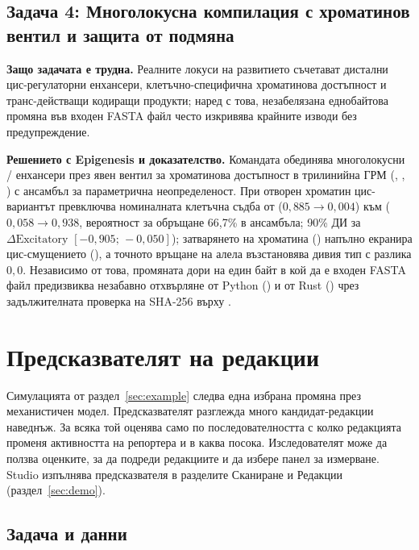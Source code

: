 \documentclass[10.5pt,a4paper]{article}
\begin{document}
\subsection{Задача 4: Многолокусна компилация с хроматинов вентил и защита от подмяна}

\textbf{Защо задачата е трудна.} Реалните локуси на развитието съчетават дистални цис-регулаторни енхансери, клетъчно-специфична хроматинова достъпност и транс-действащи кодиращи продукти; наред с това, незабелязана еднобайтова промяна във входен FASTA файл често изкривява крайните изводи без предупреждение.

\textbf{Решението с Epigenesis и доказателство.} Командата  обединява многолокусни / енхансери през явен вентил за хроматинова достъпност в трилинийна ГРМ (, , ) с ансамбъл за параметрична неопределеност. При отворен хроматин цис-вариантът превключва номиналната клетъчна съдба от  ($0{,}885\to 0{,}004$) към  ($0{,}058\to 0{,}938$, вероятност за обръщане 66,7\% в ансамбъла; 90\% ДИ за $\Delta\text{Excitatory}$ $[-0{,}905;\, -0{,}050]$); затварянето на хроматина () напълно екранира цис-смущението (), а точното връщане на алела възстановява дивия тип с разлика $0{,}0$. Независимо от това, промяната дори на един байт в кой да е входен FASTA файл предизвиква незабавно отхвърляне от Python () и от Rust () чрез задължителната проверка на SHA-256 върху .

\section{Предсказвателят на редакции}\label{sec:predictor}

Симулацията от раздел~\ref{sec:example} следва една избрана промяна през механистичен модел. Предсказвателят разглежда много кандидат-редакции наведнъж. За всяка той оценява само по последователността с колко редакцията променя активността на репортера и в каква посока. Изследователят може да ползва оценките, за да подреди редакциите и да избере панел за измерване. Studio изпълнява предсказвателя в разделите Сканиране и Редакции (раздел~\ref{sec:demo}).

\subsection{Задача и данни}\label{sec:data}
\end{document}
